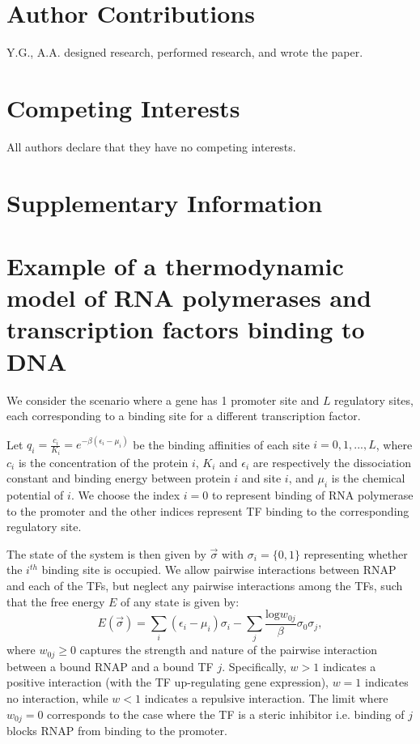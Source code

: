 \documentclass[10pt]{article}
\begin{document}
\section*{Author Contributions}
Y.G., A.A. designed research, performed research, and wrote the paper. 

\section*{Competing Interests}
All authors declare that they have no competing interests. 

\newpage 

\renewcommand{\thefigure}{S\arabic{figure}}
\renewcommand{\theequation}{S\arabic{equation}}
\renewcommand{\thetable}{S\arabic{table}}
\setcounter{figure}{0}  
\setcounter{equation}{0}  

\section*{Supplementary Information}
\appendix

\section{Example of a thermodynamic model of RNA polymerases and transcription factors binding to DNA}
\label{sec:ThermoModel}

We consider the scenario where a gene has 1 promoter site and $L$ regulatory sites, each corresponding to a binding site for a different transcription factor.

Let $q_i = \frac{c_i}{K_i} = e^{-\beta(\epsilon_i - \mu_i)}$ be the binding affinities of each site $i=0,1,...,L$, where $c_i$ is the concentration of the protein $i$, $K_i$ and $\epsilon_i$ are respectively the dissociation constant and binding energy between protein $i$ and site $i$, and $\mu_i$ is the chemical potential of $i$. We choose the index $i=0$ to represent binding of RNA polymerase to the promoter and the other indices represent TF binding to the corresponding regulatory site. 

The state of the system is then given by $\vec \sigma$ with $\sigma_i = \{0,1\}$ representing whether the $i^{th}$ binding site is occupied. We allow pairwise interactions between RNAP and each of the TFs, but neglect any pairwise interactions among the TFs, such that the free energy $E$ of any state is given by:
\begin{equation}
    E(\vec \sigma) = \sum_i (\epsilon_i-\mu_i) \sigma_i - \sum_j \frac{\text{log} w_{0j}}{\beta} \sigma_0 \sigma_j,
\end{equation}
where $w_{0j} \geq 0$ captures the strength and nature of the pairwise interaction between a bound RNAP and a bound TF $j$. Specifically, $w > 1$ indicates a positive interaction (with the TF up-regulating gene expression), $w = 1$ indicates no interaction, while $w < 1$ indicates a repulsive interaction. The limit where $w_{0j}=0$ corresponds to the case where the TF is a steric inhibitor i.e. binding of $j$ blocks RNAP from binding to the promoter. 
\end{document}
